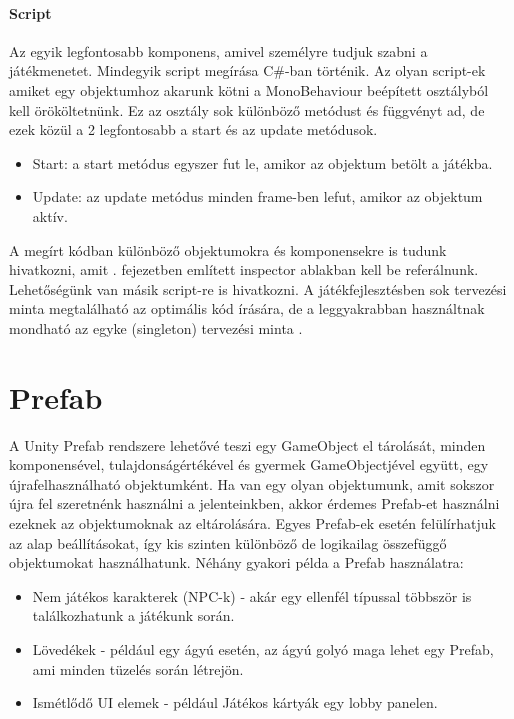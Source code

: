 \documentclass[]{thesis-ekf}
\theoremstyle{definition}
\theoremstyle{remark}
\begin{document}
\paragraph{Script}

Az egyik legfontosabb komponens, amivel személyre tudjuk szabni a játékmenetet. Mindegyik script megírása C\#-ban történik. Az olyan script-ek amiket egy objektumhoz akarunk kötni a MonoBehaviour beépített osztályból kell örököltetnünk. Ez az osztály sok különböző metódust és függvényt ad, de ezek közül a 2 legfontosabb a start és az update metódusok.

\begin{itemize}
	\item Start: a start metódus egyszer fut le, amikor az objektum betölt a játékba.
	\item Update: az update metódus minden frame-ben lefut, amikor az objektum aktív.
\end{itemize}

A megírt kódban különböző objektumokra és komponensekre is tudunk hivatkozni, amit . fejezetben említett inspector ablakban kell be referálnunk. Lehetőségünk van másik script-re is hivatkozni. A játékfejlesztésben sok tervezési minta megtalálható az optimális kód írására, de a leggyakrabban használtnak mondható az egyke (singleton) tervezési minta \cite{UnityScripting}.

\section{Prefab}
\label{sec-prefab}

A Unity Prefab rendszere lehetővé teszi egy GameObject el tárolását, minden komponensével, tulajdonságértékével és gyermek GameObjectjével együtt, egy újrafelhasználható objektumként. Ha van egy olyan objektumunk, amit sokszor újra fel szeretnénk használni a jelenteinkben, akkor érdemes Prefab-et használni ezeknek az objektumoknak az eltárolására. Egyes Prefab-ek esetén felülírhatjuk az alap beállításokat, így kis szinten különböző de logikailag összefüggő objektumokat használhatunk. Néhány gyakori példa a Prefab használatra: \cite{UnityPrefab}

\begin{itemize}
	\item Nem játékos karakterek (NPC-k) - akár egy ellenfél típussal többször is találkozhatunk a játékunk során.
	\item Lövedékek - például egy ágyú esetén, az ágyú golyó maga lehet egy Prefab, ami minden tüzelés során létrejön.
	\item Ismétlődő UI elemek - például Játékos kártyák egy lobby panelen.
\end{itemize}
\end{document}
